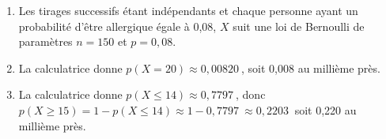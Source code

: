 \documentclass[10pt]{article}
\providecommand{\np}[2][]{{#2~#1}}
\begin{document}
\medskip









\begin{enumerate}
\item 


Les tirages successifs étant indépendants et chaque personne ayant un probabilité d'être allergique égale à 0,08, $X$ suit une loi de Bernoulli de paramètres $n = 150$ et $p = 0,08$.
\item 
La calculatrice donne $p(X = 20) \approx \np{0,00820}$, soit 0,008 au millième près.
\item 
La calculatrice donne $p(X \leqslant 14) \approx \np{0,7797}$, donc $p(X \geqslant 15) = 1 - p(X \leqslant 14) \approx 1 - \np{0,7797} \approx \np{0,2203}$ soit 0,220 au millième près.
\end{enumerate}

\bigskip
\end{document}
